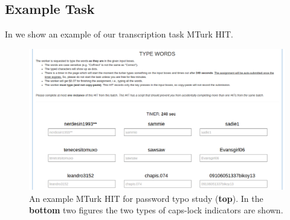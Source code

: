 \subsection{Example Task}
\label{sec:hit}

In  we show an example of our transcription task MTurk HIT. 

\begin{figure}[t]
\center
\includegraphics[width=\textwidth]{images/HIT}
\caption{An example MTurk HIT for password typo study ({\bf top}). In the {\bf bottom} two figures the two types of caps-lock indicators are shown.}
\label{fig:hit}
\end{figure}

